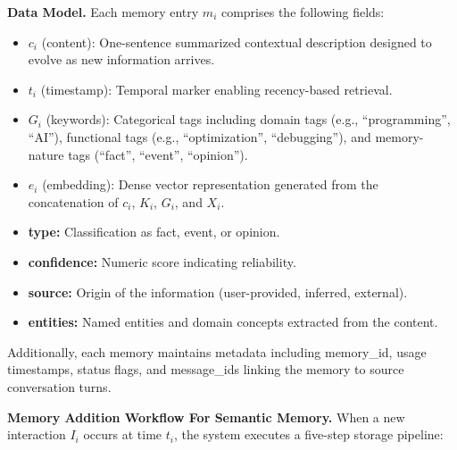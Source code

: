 \documentclass[12pt,a4paper]{article}
\begin{document}
\textbf{Data Model.} Each memory entry $m_i$ comprises the following fields:

\begin{itemize}
    \item $c_i$ (content): One-sentence summarized contextual description designed to evolve as new information arrives.
    
    \item $t_i$ (timestamp): Temporal marker enabling recency-based retrieval.
        
    \item $G_i$ (keywords): Categorical tags including domain tags (e.g., ``programming'', ``AI''), functional tags (e.g., ``optimization'', ``debugging''), and memory-nature tags (``fact'', ``event'', ``opinion'').
    
    \item $e_i$ (embedding): Dense vector representation generated from the concatenation of $c_i$, $K_i$, $G_i$, and $X_i$.
    
    \item \textbf{type:} Classification as fact, event, or opinion.
    
    \item \textbf{confidence:} Numeric score indicating reliability.
    
    \item \textbf{source:} Origin of the information (user-provided, inferred, external).
    
    \item \textbf{entities:} Named entities and domain concepts extracted from the content.
\end{itemize}

Additionally, each memory maintains metadata including memory\_id, usage timestamps, status flags, and message\_ids linking the memory to source conversation turns.

\textbf{Memory Addition Workflow For Semantic Memory.} When a new interaction $I_i$ occurs at time $t_i$, the system executes a five-step storage pipeline:
\end{document}
